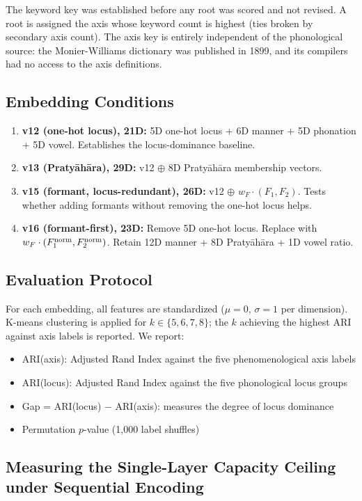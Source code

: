 \documentclass{article}
\begin{document}
The keyword key was established before any root was scored and not revised. A root is assigned the axis whose keyword count is highest (ties broken by secondary axis count). The axis key is entirely independent of the phonological source: the Monier-Williams dictionary was published in 1899, and its compilers had no access to the axis definitions.

\subsection{Embedding Conditions}

\begin{enumerate}
  \item \textbf{v12 (one-hot locus), 21D:} 5D one-hot locus + 6D manner + 5D phonation + 5D vowel. Establishes the locus-dominance baseline.
  \item \textbf{v13 (Pratyāhāra), 29D:} v12 $\oplus$ 8D Pratyāhāra membership vectors.
  \item \textbf{v15 (formant, locus-redundant), 26D:} v12 $\oplus$ $w_F \cdot (F_1, F_2)$. Tests whether adding formants without removing the one-hot locus helps.
  \item \textbf{v16 (formant-first), 23D:} Remove 5D one-hot locus. Replace with $w_F \cdot (F_1^{\rm norm}, F_2^{\rm norm})$. Retain 12D manner + 8D Pratyāhāra + 1D vowel ratio.
\end{enumerate}

\subsection{Evaluation Protocol}

For each embedding, all features are standardized ($\mu=0$, $\sigma=1$ per dimension). K-means clustering is applied for $k \in \{5, 6, 7, 8\}$; the $k$ achieving the highest ARI against axis labels is reported. We report:
\begin{itemize}[leftmargin=2em]
  \item ARI(axis): Adjusted Rand Index against the five phenomenological axis labels
  \item ARI(locus): Adjusted Rand Index against the five phonological locus groups
  \item Gap = ARI(locus) $-$ ARI(axis): measures the degree of locus dominance
  \item Permutation $p$-value (1{,}000 label shuffles)
\end{itemize}

\subsection{Measuring the Single-Layer Capacity Ceiling under Sequential Encoding}
\label{sec:ceiling}
\end{document}
